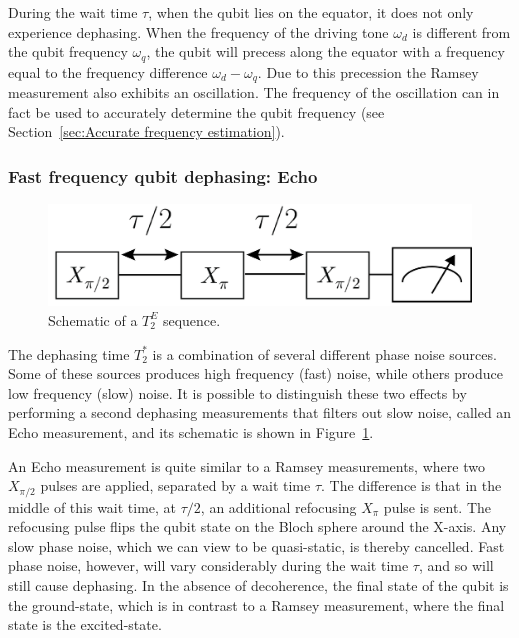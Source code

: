           During the wait time $\tau$, when the qubit lies on the equator, it does not only experience dephasing. When the frequency of the driving tone $\omega_d$ is different from the qubit frequency $\omega_q$, the qubit will precess along the equator with a frequency equal to the frequency difference $\omega_d - \omega_q$. Due to this precession the Ramsey measurement also exhibits an oscillation. The frequency of the oscillation can in fact be used to accurately determine the qubit frequency (see Section~\ref{sec:Accurate frequency estimation}).

        \subsubsection{Fast frequency qubit dephasing: Echo}

          \begin{figure}
            \begin{center}
            \vspace{-30pt}
              \includegraphics[width=\textwidth]{../Figures/Qubit characterization/T2echo decoherence.png}
            \end{center}
            \vspace{-20 pt}
            \caption{Schematic of a $T_2^E$ sequence.}
            \label{fig:T2echo schematic}
          \end{figure}

          The dephasing time $T_2^*$ is a combination of several different phase noise sources. Some of these sources produces high frequency (fast) noise, while others produce low frequency (slow) noise. It is possible to distinguish these two effects by performing a second dephasing measurements that filters out slow noise, called an Echo measurement, and its schematic is shown in Figure~\ref{fig:T2echo schematic}.

          An Echo measurement is quite similar to a Ramsey measurements, where two $X_{\pi/2}$ pulses are applied, separated by a wait time $\tau$. The difference is that in the middle of this wait time, at $\tau/2$, an additional refocusing $X_{\pi}$ pulse is sent. The refocusing pulse flips the qubit state on the Bloch sphere around the X-axis. Any slow phase noise, which we can view to be quasi-static, is thereby cancelled. Fast phase noise, however, will vary considerably during the wait time $\tau$, and so will still cause dephasing. In the absence of decoherence, the final state of the qubit is the ground-state, which is in contrast to a Ramsey measurement, where the final state is the excited-state.

